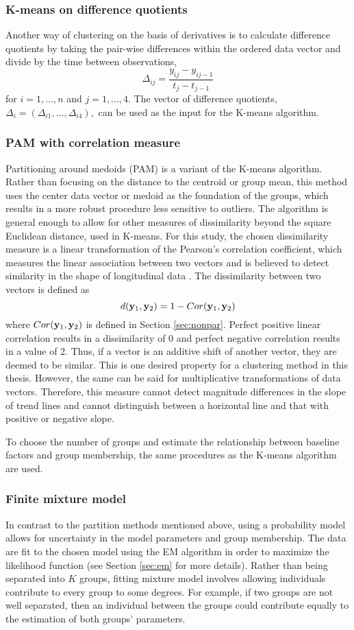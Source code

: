 \subsubsection{K-means on difference quotients}
Another way of clustering on the basis of derivatives is to calculate difference quotients by taking the pair-wise differences within the ordered data vector and divide by the time between observations,
$$\Delta_{ij} = \frac{y_{ij}-y_{ij-1}}{t_{j}-t_{j-1}}$$
for $i=1,...,n$ and $j=1,...,4$. The vector of difference quotients, $\Delta_{i}=(\Delta_{i1},...,\Delta_{i4}),$ can be used as the input for the K-means algorithm.

\subsubsection{PAM with correlation measure}
Partitioning around medoids (PAM) is a variant of the K-means algorithm. Rather than focusing on the distance to the centroid or group mean, this method uses the center data vector or medoid as the foundation of the groups, which results in a more robust procedure less sensitive to outliers. The algorithm is general enough to allow for other measures of dissimilarity beyond the square Euclidean distance, used in K-means. For this study, the chosen dissimilarity measure is a linear transformation of the Pearson's correlation coefficient, which measures the linear association between two vectors and is believed to detect similarity in the shape of longitudinal data \cite{chouakria2007,  eisen1998,chiou2008}. The dissimilarity between two vectors is defined as
$$d(\mathbf y_{1},\mathbf y_{2}) = 1-Cor(\mathbf y_{1},\mathbf y_{2})$$
where $Cor(\mathbf y_{1},\mathbf y_{2})$ is defined in Section \ref{sec:nonpar}. Perfect positive linear correlation results in a dissimilarity of 0 and perfect negative correlation results in a value of 2. Thus, if a vector is an additive shift of another vector, they are deemed to be similar. This is one desired property for a clustering method in this thesis. However, the same can be said for multiplicative transformations of data vectors. Therefore, this measure cannot detect magnitude differences in the slope of trend lines and cannot distinguish between a horizontal line and that with positive or negative slope.

To choose the number of groups and estimate the relationship between baseline factors and group membership, the same procedures as the K-means algorithm are used.

\subsubsection{Finite mixture model}
In contrast to the partition methods mentioned above, using a probability model allows for uncertainty in the model parameters and group membership. The data are fit to the chosen model using the EM algorithm in order to maximize the likelihood function (see Section \ref{sec:em} for more details). Rather than being separated into $K$ groups, fitting mixture model involves allowing individuals contribute to every group to some degrees. For example, if two groups are not well separated, then an individual between the groups could contribute equally to the estimation of both groups' parameters. 


